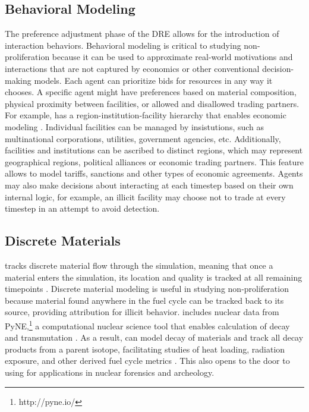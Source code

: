 \subsection{Behavioral Modeling}
The preference adjustment phase of the \gls{DRE} allows for the introduction of interaction behaviors.  Behavioral modeling is critical to studying non-proliferation because it can be used to approximate real-world motivations and interactions that are not captured by economics or other conventional decision-making models.  Each agent can prioritize bids for resources in any way it chooses. A specific agent might have preferences based on material composition, physical proximity between facilities, or allowed and disallowed trading partners. For example, \Cyclus has a region-institution-facility hierarchy that enables economic modeling \cite{oliver_geniusv2:_2009}.  Individual facilities can be managed by insistutions, such as multinational corporations, utilities, government agencies, etc.  Additionally, facilities and institutions can be ascribed to distinct regions, which may represent geographical regions, political alliances or economic trading partners. This feature allows \Cyclus to model tariffs, sanctions and other types of economic agreements.    Agents may also make decisions about interacting at each timestep based on their own internal logic, for example, an illicit facility may choose not to trade at every timestep in an attempt to avoid detection. 

\subsection{Discrete Materials}
\Cyclus tracks discrete material flow through the simulation, meaning that once a material enters the simulation, its location and quality is tracked at all remaining timepoints \cite{huff_integrated:_2013}. Discrete material modeling is useful in studying non-proliferation because material found anywhere in the fuel cycle can be tracked back to its source, providing attribution for illicit behavior. \Cyclus includes nuclear data from PyNE,\footnote{http://pyne.io/} a computational nuclear science tool that enables calculation of decay and transmutation \cite{Scopatz2012b}. As a result, \Cyclus can  model decay of materials and track all decay products from a parent isotope, facilitating studies of heat loading, radiation exposure, and other derived fuel cycle metrics \cite{scopatz_cymetric_2015}. This also opens to the door to using \Cyclus for applications in nuclear forensics and archeology.
